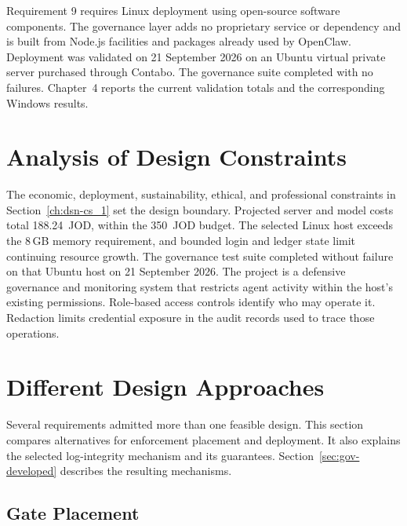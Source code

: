 {\color{red}Requirement 9 requires Linux deployment using open-source software
components. The governance layer adds no proprietary service or dependency and
is built from Node.js facilities and packages already used by OpenClaw.
Deployment was validated on 21 September 2026 on an Ubuntu virtual private
server purchased through Contabo. The governance suite completed with no
failures. Chapter~4 reports the current validation totals and the corresponding
Windows results.}

\section{Analysis of Design Constraints}
\label{sec:gov-constraints}

{\color{red}The economic, deployment, sustainability, ethical, and professional
constraints in Section~\ref{ch:dsn-cs_1} set the design boundary. Projected
server and model costs total 188.24~JOD, within the 350~JOD budget. The selected
Linux host exceeds the 8\,GB memory requirement, and bounded login and ledger
state limit continuing resource growth. The governance test suite completed
without failure on that Ubuntu host on 21 September 2026. The project is a
defensive governance and monitoring system that restricts agent activity within
the host's existing permissions. Role-based access controls identify who may
operate it. Redaction limits credential exposure in the audit records used to
trace those operations.}
\section{Different Design Approaches}
\label{sec:gov-approaches}

{\color{red}Several requirements admitted more than one feasible design. This section
compares alternatives for enforcement placement and deployment. It also
explains the selected log-integrity mechanism and its guarantees.
Section~\ref{sec:gov-developed} describes the resulting mechanisms.}

\subsection{Gate Placement}
\label{sec:gov-gate-placement}

